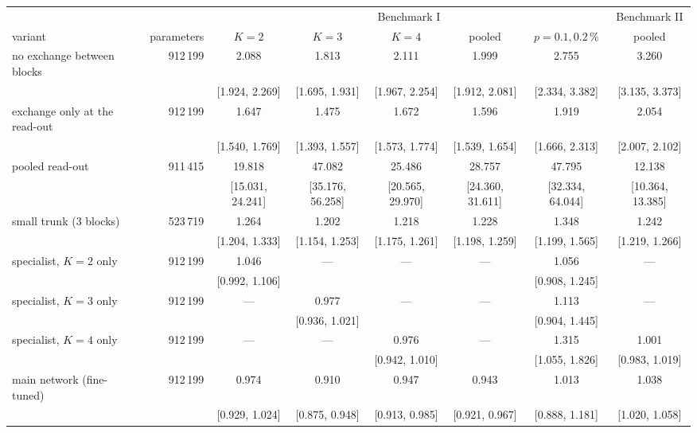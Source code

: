 \begin{tabular}{@{}lrcccccc@{}}
\toprule
& & \multicolumn{5}{c}{Benchmark I} & Benchmark II \\
\cmidrule(lr){3-7}
variant & parameters & $K=2$ & $K=3$ & $K=4$ & pooled & $p=0.1, 0.2\,\%$ & pooled \\
\midrule
no exchange between blocks & 912\,199 & 2.088 & 1.813 & 2.111 & 1.999 & 2.755 & 3.260 \\
 &  & {\tiny[1.924, 2.269]} & {\tiny[1.695, 1.931]} & {\tiny[1.967, 2.254]} & {\tiny[1.912, 2.081]} & {\tiny[2.334, 3.382]} & {\tiny[3.135, 3.373]} \\
exchange only at the read-out & 912\,199 & 1.647 & 1.475 & 1.672 & 1.596 & 1.919 & 2.054 \\
 &  & {\tiny[1.540, 1.769]} & {\tiny[1.393, 1.557]} & {\tiny[1.573, 1.774]} & {\tiny[1.539, 1.654]} & {\tiny[1.666, 2.313]} & {\tiny[2.007, 2.102]} \\
pooled read-out & 911\,415 & 19.818 & 47.082 & 25.486 & 28.757 & 47.795 & 12.138 \\
 &  & {\tiny[15.031, 24.241]} & {\tiny[35.176, 56.258]} & {\tiny[20.565, 29.970]} & {\tiny[24.360, 31.611]} & {\tiny[32.334, 64.044]} & {\tiny[10.364, 13.385]} \\
small trunk (3 blocks) & 523\,719 & 1.264 & 1.202 & 1.218 & 1.228 & 1.348 & 1.242 \\
 &  & {\tiny[1.204, 1.333]} & {\tiny[1.154, 1.253]} & {\tiny[1.175, 1.261]} & {\tiny[1.198, 1.259]} & {\tiny[1.199, 1.565]} & {\tiny[1.219, 1.266]} \\
specialist, $K=2$ only & 912\,199 & 1.046 & --- & --- & --- & 1.056 & --- \\
 &  & {\tiny[0.992, 1.106]} &  &  &  & {\tiny[0.908, 1.245]} &  \\
specialist, $K=3$ only & 912\,199 & --- & 0.977 & --- & --- & 1.113 & --- \\
 &  &  & {\tiny[0.936, 1.021]} &  &  & {\tiny[0.904, 1.445]} &  \\
specialist, $K=4$ only & 912\,199 & --- & --- & 0.976 & --- & 1.315 & 1.001 \\
 &  &  &  & {\tiny[0.942, 1.010]} &  & {\tiny[1.055, 1.826]} & {\tiny[0.983, 1.019]} \\
\midrule
main network (fine-tuned) & 912\,199 & 0.974 & 0.910 & 0.947 & 0.943 & 1.013 & 1.038 \\
 &  & {\tiny[0.929, 1.024]} & {\tiny[0.875, 0.948]} & {\tiny[0.913, 0.985]} & {\tiny[0.921, 0.967]} & {\tiny[0.888, 1.181]} & {\tiny[1.020, 1.058]} \\
\bottomrule
\end{tabular}
